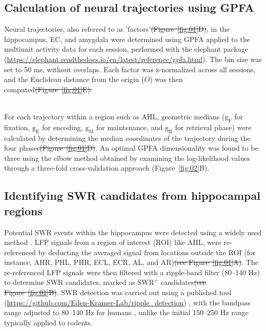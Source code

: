 \documentclass[final,3p,times,twocolumn]{elsarticle}
\providecommand{\DIFaddtex}[1]{{\protect\color{blue}\uwave{#1}}} %
\providecommand{\DIFdeltex}[1]{{\protect\color{red}\sout{#1}}}                      %
\providecommand{\DIFaddbegin}{} %
\providecommand{\DIFaddend}{} %
\providecommand{\DIFdelbegin}{} %
\providecommand{\DIFdelend}{} %
\providecommand{\DIFadd}[1]{\texorpdfstring{\DIFaddtex{#1}}{#1}} %
\providecommand{\DIFdel}[1]{\texorpdfstring{\DIFdeltex{#1}}{}} %
\newcommand{\DIFscaledelfig}{0.5}
\newlength{\DIFdelgraphicswidth} %
\newlength{\DIFdelgraphicsheight} %
\newcommand{\DIFaddincludegraphics}[2][]{{\color{blue}\fbox{\DIFOincludegraphics[#1]{#2}}}} %
\newcommand{\DIFdelincludegraphics}[2][]{%
\sbox{\DIFdelgraphicsbox}{\DIFOincludegraphics[#1]{#2}}%
\settoboxwidth{\DIFdelgraphicswidth}{\DIFdelgraphicsbox} %
\settoboxtotalheight{\DIFdelgraphicsheight}{\DIFdelgraphicsbox} %
\scalebox{\DIFscaledelfig}{%
\parbox[b]{\DIFdelgraphicswidth}{\usebox{\DIFdelgraphicsbox}\\[-\baselineskip] \rule{\DIFdelgraphicswidth}{0em}}\llap{\resizebox{\DIFdelgraphicswidth}{\DIFdelgraphicsheight}{%
\setlength{\unitlength}{\DIFdelgraphicswidth}%
\begin{picture}(1,1)%
\thicklines\linethickness{2pt} %
{\color[rgb]{1,0,0}\put(0,0){\framebox(1,1){}}}%
{\color[rgb]{1,0,0}\put(0,0){\line( 1,1){1}}}%
{\color[rgb]{1,0,0}\put(0,1){\line(1,-1){1}}}%
\end{picture}%
}\hspace*{3pt}}} %
} %
\DeclareRobustCommand{\DIFaddbegin}{\DIFOaddbegin \let\includegraphics\DIFaddincludegraphics} %
\DeclareRobustCommand{\DIFaddend}{\DIFOaddend \let\includegraphics\DIFOincludegraphics} %
\DeclareRobustCommand{\DIFdelbegin}{\DIFOdelbegin \let\includegraphics\DIFdelincludegraphics} %
\DeclareRobustCommand{\DIFdelend}{\DIFOaddend \let\includegraphics\DIFOincludegraphics} %
\begin{document}
\subsection{Calculation of neural trajectories using GPFA}
Neural trajectories, also referred to as 'factors'\DIFdelbegin \DIFdel{(Figure~\ref{fig:01}D)}\DIFdelend , in the hippocampus, EC, and amygdala were determined using GPFA \cite{yu_gaussian-process_2009} applied to the multiunit activity data for each session, performed with the elephant package (\url{https://elephant.readthedocs.io/en/latest/reference/gpfa.html}). The bin size was set to 50 ms, without overlaps. Each factor was z-normalized across all sessions, and the Euclidean distance from the origin ($O$) was then computed\DIFdelbegin \DIFdel{(Figure~\ref{fig:01}E).
}%

\DIFdelend \DIFaddbegin \DIFadd{.
}\\
\indent
\DIFaddend For each trajectory within a region such as AHL, geometric medians ($\mathrm{g_{F}}$ for fixation, $\mathrm{g_{E}}$ for encoding, $\mathrm{g_{M}}$ for maintenance, and $\mathrm{g_{R}}$ for retrieval phase) were calculated by determining the median coordinates of the trajectory during the four phases\DIFdelbegin \DIFdel{(Figure~\ref{fig:01}D)}\DIFdelend . An optimal GPFA dimensionality was found to be three using the elbow method obtained by examining the log-likelihood values through a three-fold cross-validation approach (Figure~\ref{fig:02}B).

\subsection{Identifying SWR candidates from hippocampal regions}
Potential SWR events within the hippocampus were detected using a widely used method \cite{liu_consensus_2022}. LFP signals from a region of interest (ROI) like AHL, were re-referenced by deducting the averaged signal from locations outside the ROI (for instance, AHR, PHL, PHR, ECL, ECR, AL, and AR)\DIFdelbegin \DIFdel{(see Figure~\ref{fig:01}A)}\DIFdelend . The re-referenced LFP signals were then filtered with a ripple-band filter (80--140 Hz) to determine SWR candidates, marked as $\textrm{SWR}^+$ candidates\DIFdelbegin \DIFdel{(see Figure~\ref{fig:01}B)}\DIFdelend . SWR detection was carried out using a published tool (\url{https://github.com/Eden-Kramer-Lab/ripple_detection}) \cite{kay_hippocampal_2016}, with the bandpass range adjusted to 80--140 Hz for humans \cite{norman_hippocampal_2019} \cite{norman_hippocampal_2021}, unlike the initial 150--250 Hz range typically applied to rodents.
\DIFdelbegin %
\end{document}

